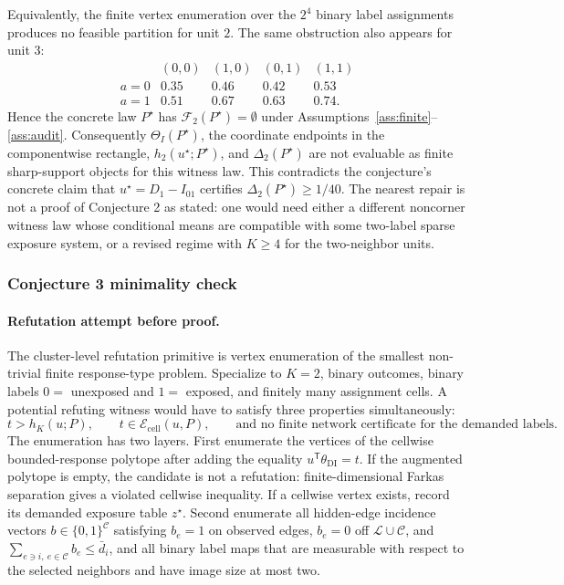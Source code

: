 \documentclass[11pt]{article}
\newcommand{\transpose}{\mathsf{T}}
\theoremstyle{definition}
\theoremstyle{plain}
\theoremstyle{remark}
\begin{document}
Equivalently, the finite vertex enumeration over the \(2^4\) binary label assignments produces no feasible partition for unit \(2\).  The same obstruction also appears for unit \(3\):
\[
\begin{array}{c|cccc}
& (0,0)&(1,0)&(0,1)&(1,1)\\ \hline
a=0&0.35&0.46&0.42&0.53\\
a=1&0.51&0.67&0.63&0.74 .
\end{array}
\]
Hence the concrete law \(P^\star\) has \(\mathcal F_2(P^\star)=\emptyset\) under Assumptions~\ref{ass:finite}--\ref{ass:audit}.  Consequently \(\Theta_I(P^\star)\), the coordinate endpoints in the componentwise rectangle, \(h_2(u^\star;P^\star)\), and \(\Delta_2(P^\star)\) are not evaluable as finite sharp-support objects for this witness law.  This contradicts the conjecture's concrete claim that \(u^\star=D_1-I_{01}\) certifies \(\Delta_2(P^\star)\ge1/40\).  The nearest repair is not a proof of Conjecture 2 as stated: one would need either a different noncorner witness law whose conditional means are compatible with some two-label sparse exposure system, or a revised regime with \(K\ge4\) for the two-neighbor units.

\subsubsection*{Conjecture 3 minimality check}
\paragraph{Refutation attempt before proof.}
The cluster-level refutation primitive is vertex enumeration of the smallest non-trivial finite response-type problem.  Specialize to \(K=2\), binary outcomes, binary labels \(0=\) unexposed and \(1=\) exposed, and finitely many assignment cells.  A potential refuting witness would have to satisfy three properties simultaneously:
\[
t>h_K(u;P),\qquad t\in\mathcal E_{\mathrm{cell}}(u,P),\qquad
\text{and no finite network certificate for the demanded labels.}
\]
The enumeration has two layers.  First enumerate the vertices of the cellwise bounded-response polytope after adding the equality \(u^\transpose\theta_{\mathrm{DI}}=t\).  If the augmented polytope is empty, the candidate is not a refutation: finite-dimensional Farkas separation gives a violated cellwise inequality.  If a cellwise vertex exists, record its demanded exposure table \(z^\star\).  Second enumerate all hidden-edge incidence vectors \(b\in\{0,1\}^{\mathcal C}\) satisfying \(b_e=1\) on observed edges, \(b_e=0\) off \(\mathcal L\cup\mathcal C\), and \(\sum_{e\ni i,\ e\in\mathcal C}b_e\le\bar d_i\), and all binary label maps that are measurable with respect to the selected neighbors and have image size at most two.
\end{document}
